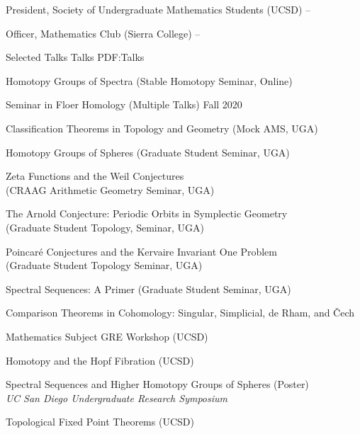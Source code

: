 \documentclass[letterpaper,MMMyyyy,nonstopmode]{simpleresumecv}
\begin{document}
\begin{Body}

\Gap
\BulletItem
President,
Society of Undergraduate Mathematics Students (UCSD)
\hfill{} --

\Gap
\BulletItem
Officer, Mathematics Club (Sierra College)
\hfill
{} --

\Section
{Selected Talks}
{Talks}
{PDF:Talks}


\BulletItem
Homotopy Groups of Spectra (Stable Homotopy Seminar, Online)
\hfill {}

\BulletItem
Seminar in Floer Homology (Multiple Talks)
\hfill Fall 2020

\BulletItem
Classification Theorems in Topology and Geometry (Mock AMS, UGA)
\hfill {}

\BulletItem
Homotopy Groups of Spheres (Graduate Student Seminar, UGA)
\hfill {}

\BulletItem
Zeta Functions and the Weil Conjectures \\
(CRAAG Arithmetic Geometry Seminar, UGA)
\hfill {}

\BulletItem
The Arnold Conjecture: Periodic Orbits in Symplectic Geometry \\ (Graduate Student Topology, Seminar, UGA)
\hfill {}

\BulletItem
Poincaré Conjectures and the Kervaire Invariant One Problem \\(Graduate Student Topology Seminar, UGA)
\hfill {}

\BulletItem
Spectral Sequences: A Primer (Graduate Student Seminar, UGA)
\hfill {}

\BulletItem
Comparison Theorems in Cohomology: Singular, Simplicial, de Rham, and Čech
\hfill {}

\BulletItem
Mathematics Subject GRE Workshop (UCSD)
\hfill {}

\BulletItem
Homotopy and the Hopf Fibration (UCSD)
\hfill {}

\BulletItem
Spectral Sequences and Higher Homotopy Groups of Spheres (Poster) \\
\textit{UC San Diego Undergraduate Research Symposium}
\hfill {}

\BulletItem
Topological Fixed Point Theorems (UCSD)
\hfill {}


\end{Body}
\end{document}
